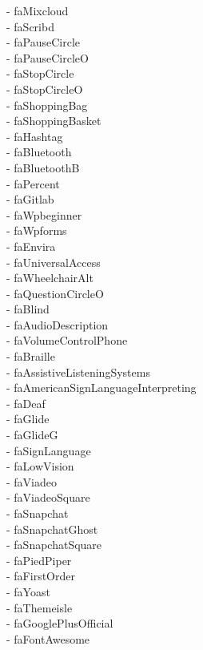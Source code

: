 \documentclass[%
               doublesided,
               paper=a4,
               fontsize=10pt
              ]{my-resume}
\begin{document}
- faMixcloud\\ \faScribd - faScribd\\ \faPauseCircle - faPauseCircle\\ \faPauseCircleO - faPauseCircleO\\ \faStopCircle - faStopCircle\\ \faStopCircleO - faStopCircleO\\ \faShoppingBag - faShoppingBag\\ \faShoppingBasket - faShoppingBasket\\ \faHashtag - faHashtag\\ \faBluetooth - faBluetooth\\ \faBluetoothB - faBluetoothB\\ \faPercent - faPercent\\ \faGitlab - faGitlab\\ \faWpbeginner - faWpbeginner\\ \faWpforms - faWpforms\\ \faEnvira - faEnvira\\ \faUniversalAccess - faUniversalAccess\\ \faWheelchairAlt - faWheelchairAlt\\ \faQuestionCircleO - faQuestionCircleO\\ \faBlind - faBlind\\ \faAudioDescription - faAudioDescription\\ \faVolumeControlPhone - faVolumeControlPhone\\ \faBraille - faBraille\\ \faAssistiveListeningSystems - faAssistiveListeningSystems\\ \faAmericanSignLanguageInterpreting - faAmericanSignLanguageInterpreting\\ \faDeaf - faDeaf\\ \faGlide - faGlide\\ \faGlideG - faGlideG\\ \faSignLanguage - faSignLanguage\\ \faLowVision - faLowVision\\ \faViadeo - faViadeo\\ \faViadeoSquare - faViadeoSquare\\ \faSnapchat - faSnapchat\\ \faSnapchatGhost - faSnapchatGhost\\ \faSnapchatSquare - faSnapchatSquare\\ \faPiedPiper - faPiedPiper\\ \faFirstOrder - faFirstOrder\\ \faYoast - faYoast\\ \faThemeisle - faThemeisle\\ \faGooglePlusOfficial - faGooglePlusOfficial\\ \faFontAwesome - faFontAwesome\\
\end{document}
